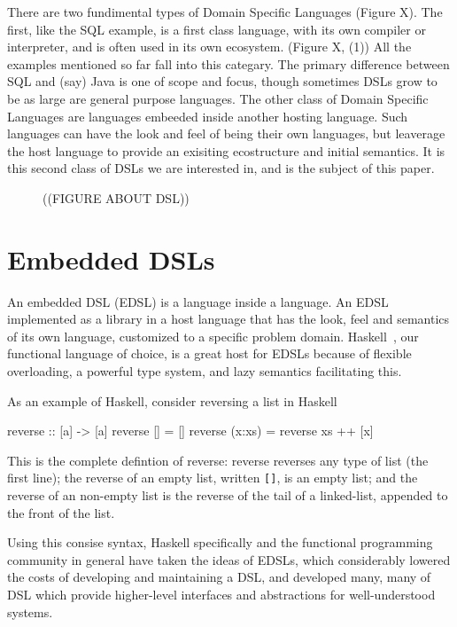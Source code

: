 \documentclass[11pt]{article}
\begin{document}
There are two fundimental types of Domain Specific Languages
(Figure X).
%
The first, like the SQL example, is a first class language,
with its own compiler or interpreter, and is often used in
its own ecosystem. (Figure X, (1)) 
All the examples mentioned so far fall
into this categary. The primary difference between SQL and
(say) Java is one of scope and focus, though sometimes
DSLs grow to be as large are general purpose languages.
%
The other class of Domain Specific Languages are languages
embeeded inside another hosting language. Such languages
can have the look and feel of being their own languages,
but leaverage the host language to provide an exisiting
ecostructure and initial semantics. It is this second
class of DSLs we are interested in, and is the subject of
this paper.

\begin{figure}
((FIGURE ABOUT DSL))

\end{figure}

\section{Embedded DSLs}

An embedded DSL (EDSL) is a language inside a language.
An EDSL implemented as a library in a host language
that has the look, feel and semantics of its own language,
customized to a specific problem domain.
Haskell~\cite{Haskell98Book}, our functional language of choice, is a great host for EDSLs
because of flexible overloading, a powerful type system, and lazy semantics facilitating this.

As an example of Haskell, consider reversing a list in Haskell
\begin{Code}
reverse :: [a] -> [a]
reverse []     = []
reverse (x:xs) = reverse xs ++ [x]
\end{Code}

This is the complete defintion of reverse: reverse reverses any type of list (the first line);
the reverse of an empty list, written \verb|[]|, is an empty list;
and the reverse of an non-empty list is the reverse of the tail of a linked-list,
appended to the front of the list.

Using this consise syntax, Haskell specifically and the functional programming
community in general have taken the ideas
of EDSLs, which considerably lowered the costs of developing
and maintaining a DSL, and developed many, many of DSL 
which provide higher-level interfaces and abstractions for well-understood systems.
\end{document}
